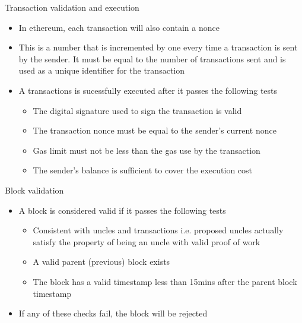 \documentclass[11pt]{beamer}
\begin{document}

\begin{frame}{Transaction validation and execution}
	\begin{itemize}
		\item In ethereum, each transaction will also contain a nonce
		\item This is a number that is incremented by one every time a transaction is sent by the sender. It must be equal to the number of transactions sent and is used as a unique identifier for the transaction
		\item A transactions is sucessfully executed after it passes the following tests
		\begin{itemize}
			\item The digital signature used to sign the transaction is valid
			\item The transaction nonce must be equal to the sender's current nonce
			\item Gas limit must not be less than the gas use by the transaction
			\item The sender's balance is sufficient to cover the execution cost
		\end{itemize}
	\end{itemize}
\end{frame}


\begin{frame}{Block validation}
	\begin{itemize}
		\item A block is considered valid if it passes the following tests
		\begin{itemize}
			\item Consistent with uncles and transactions i.e. proposed uncles actually satisfy the property of being an uncle with valid proof of work
			\item A valid parent (previous) block exists
			\item The block has a valid timestamp less than 15mins after the parent block timestamp
		\end{itemize}
		\item If any of these checks fail, the block will be rejected
	\end{itemize}
\end{frame}

\end{document}
